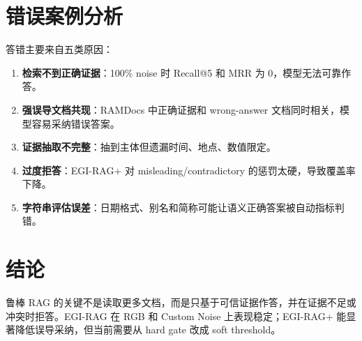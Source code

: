 \documentclass[11pt,a4paper]{article}
\newcommand{\zh}[1]{{\cjkfont #1}}
\begin{document}
\section{\zh{错误案例分析}}
\zh{答错主要来自五类原因：}
\begin{enumerate}
  \item \zh{\textbf{检索不到正确证据}：100\% noise 时 Recall@5 和 MRR 为 0，模型无法可靠作答。}
  \item \zh{\textbf{强误导文档共现}：RAMDocs 中正确证据和 wrong-answer 文档同时相关，模型容易采纳错误答案。}
  \item \zh{\textbf{证据抽取不完整}：抽到主体但遗漏时间、地点、数值限定。}
  \item \zh{\textbf{过度拒答}：EGI-RAG+ 对 misleading/contradictory 的惩罚太硬，导致覆盖率下降。}
  \item \zh{\textbf{字符串评估误差}：日期格式、别名和简称可能让语义正确答案被自动指标判错。}
\end{enumerate}

\section{\zh{结论}}
\zh{鲁棒 RAG 的关键不是读取更多文档，而是只基于可信证据作答，并在证据不足或冲突时拒答。EGI-RAG 在 RGB 和 Custom Noise 上表现稳定；EGI-RAG+ 能显著降低误导采纳，但当前需要从 hard gate 改成 soft threshold。}
\end{document}
